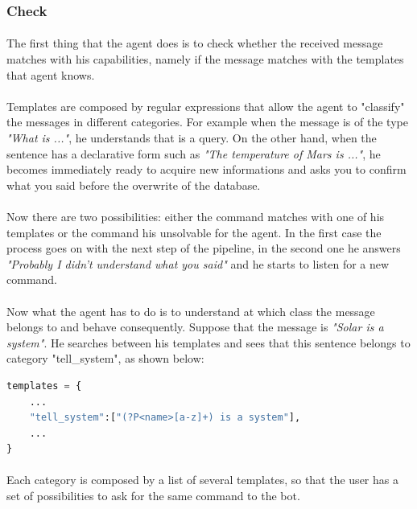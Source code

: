 \documentclass[12pt, a4paper]{article}
\begin{document}
\subsubsection{Check}
\paragraph{}
The first thing that the agent does is to check whether the received message matches with his capabilities, namely if the message matches with the templates that agent knows.
\paragraph{}
Templates are composed by regular expressions that allow the agent to "classify" the messages in different categories. For example when the message is of the type \textit{"What is ..."}, he understands that is a query. On the other hand, when the sentence has a declarative form such as \textit{"The temperature of Mars is ..."}, he becomes immediately ready to acquire new informations and asks you to confirm what you said before the  overwrite of the database.
\paragraph{}
Now there are two possibilities: either the command matches with one of his templates or the command his unsolvable for the agent.
In the first case the process goes on with the next step of the pipeline, in the second one he answers \textit{"Probably I didn't understand what you said"} and he starts to listen for a new command. 
\paragraph{}
Now what the agent has to do is to understand at which class the message belongs to and behave consequently.
Suppose that the message is \textit{"Solar is a system"}. He searches between his templates and sees that this sentence belongs to category "tell\_system", as shown below:
\vspace{1em}
\begin{lstlisting}[language=Python]
templates = {
	...
	"tell_system":["(?P<name>[a-z]+) is a system"],
	...
}
\end{lstlisting}
\paragraph{}
Each category is composed by a list of several templates, so that the user has a set of possibilities to ask for the same command to the bot.
\end{document}
